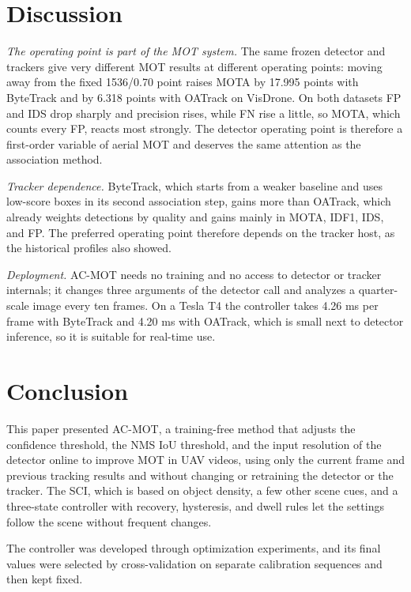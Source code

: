 \documentclass[journal]{new-aiaa}
\begin{document}
\section{Discussion}\label{sec:discussion}

\emph{The operating point is part of the MOT system.} The same frozen detector
and trackers give very different MOT results at different operating points:
moving away from the fixed 1536/0.70 point raises MOTA by 17.995 points with
ByteTrack and by 6.318 points with OATrack on VisDrone. On both datasets FP
and IDS drop sharply and precision rises, while FN rise a little, so MOTA,
which counts every FP, reacts most strongly. The detector operating point is therefore a first-order variable of
aerial MOT and deserves the same attention as the association method.

\emph{Tracker dependence.} ByteTrack, which starts from a weaker baseline and
uses low-score boxes in its second association step, gains more than OATrack,
which already weights detections by quality and gains mainly in MOTA, IDF1,
IDS, and FP. The preferred operating point therefore depends on the tracker
host, as the historical profiles also showed.

\emph{Deployment.} AC-MOT needs no training and no access to detector or
tracker internals; it changes three arguments of the detector call and
analyzes a quarter-scale image every ten frames. On a Tesla T4 the controller
takes 4.26 ms per frame with ByteTrack and 4.20 ms with OATrack, which is
small next to detector inference, so it is suitable for real-time use.
\section{Conclusion}\label{sec:conclusion}

This paper presented AC-MOT, a training-free method that adjusts the
confidence threshold, the NMS IoU threshold, and the input resolution of the
detector online to improve MOT in UAV videos, using only the current frame and
previous tracking results and without changing or retraining the detector or
the tracker. The SCI, which is based on object density, a few other scene
cues, and a three-state controller with recovery, hysteresis, and dwell rules
let the settings follow the scene without frequent changes.

The controller was developed through optimization experiments, and its final
values were selected by cross-validation on separate calibration sequences and
then kept fixed.
\end{document}
